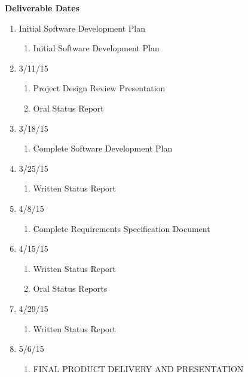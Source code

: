 \documentclass{article}
\begin{document}
\textbf{Deliverable Dates}
\begin{enumerate}
\item Initial Software Development Plan
	\begin{enumerate}
	\item Initial Software Development Plan
	\end{enumerate}
\item 3/11/15
	\begin{enumerate}
	\item Project Design Review Presentation
	\item Oral Status Report
	\end{enumerate}
\item 3/18/15
	\begin{enumerate}
	\item Complete Software Development Plan
	\end{enumerate}
\item 3/25/15
	\begin{enumerate}
	\item Written Status Report
	\end{enumerate}
\item 4/8/15
	\begin{enumerate}
	\item Complete Requirements Specification Document
	\end{enumerate}
\item 4/15/15
	\begin{enumerate}
	\item Written Status Report
	\item Oral Status Reports
	\end{enumerate}
\item 4/29/15
	\begin{enumerate}
	\item Written Status Report
	\end{enumerate}
\item 5/6/15
	\begin{enumerate}
	\item FINAL PRODUCT DELIVERY AND PRESENTATION
	\end{enumerate}
\end{enumerate}
\end{document}
